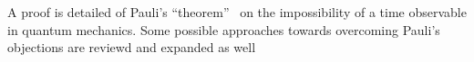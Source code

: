 A proof is detailed of Pauli's ``theorem''~\parencite{PauliFootnote}
on the impossibility of a time observable in quantum mechanics. Some possible
approaches towards overcoming Pauli's objections are reviewd and expanded as well
